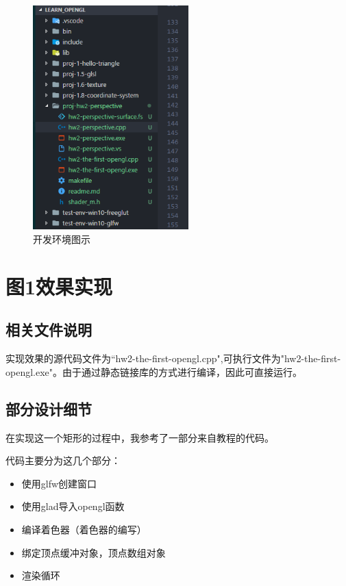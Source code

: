 \documentclass[forprint]{myreport}
\begin{document}
\begin{figure}[htp]
  \centering
  \includegraphics[width=6cm]{"figure/2018-05-01-16-04-36.png"}
  \caption{开发环境图示}
  \label{fig:env}
\end{figure}





\chapter{图1效果实现}

\section{相关文件说明}

实现效果的源代码文件为“hw2-the-first-opengl.cpp",可执行文件为"hw2-the-first-opengl.exe"。由于通过静态链接库的方式进行编译，因此可直接运行。

\section{部分设计细节}

在实现这一个矩形的过程中，我参考了一部分来自教程\cite{r1}的代码。

代码主要分为这几个部分：

\begin{itemize}
  \item 使用glfw创建窗口
  \item 使用glad导入opengl函数
  \item 编译着色器（着色器的编写）
  \item 绑定顶点缓冲对象，顶点数组对象
  \item 渲染循环
\end{itemize}
\end{document}
